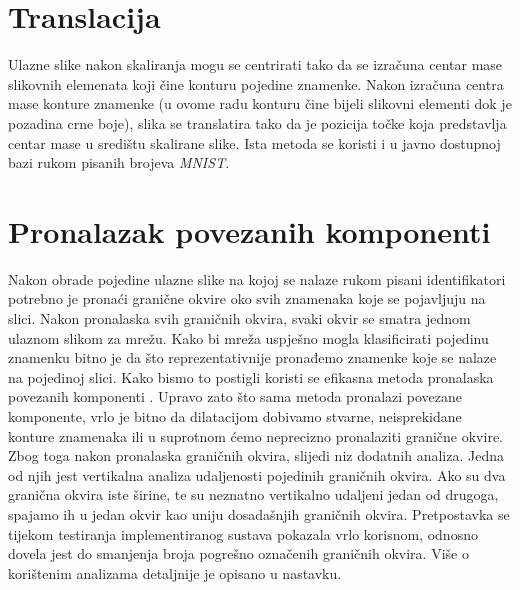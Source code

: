 \documentclass[times, utf8, diplomski]{fer}
\theoremstyle{definition}
\begin{document}
\section{Translacija}
Ulazne slike nakon skaliranja mogu se centrirati tako da se izračuna centar mase slikovnih elemenata koji čine konturu pojedine znamenke. Nakon izračuna centra mase konture znamenke (u ovome radu konturu čine bijeli slikovni elementi dok je pozadina crne boje), slika se translatira tako da je pozicija točke koja predstavlja centar mase u središtu skalirane slike. Ista metoda se koristi i u javno dostupnoj bazi rukom pisanih brojeva \textit{MNIST}.
\section{Pronalazak povezanih komponenti}
Nakon obrade pojedine ulazne slike na kojoj se nalaze rukom pisani identifikatori potrebno je pronaći granične okvire oko svih znamenaka koje se pojavljuju na slici. Nakon pronalaska svih graničnih okvira, svaki okvir se smatra jednom ulaznom slikom za mrežu. Kako bi mreža uspješno mogla klasificirati pojedinu znamenku bitno je da što reprezentativnije pronađemo znamenke koje se nalaze na pojedinoj slici. Kako bismo to postigli koristi se efikasna metoda pronalaska povezanih komponenti . Upravo zato što sama metoda pronalazi povezane komponente, vrlo je bitno da dilatacijom dobivamo stvarne, neisprekidane konture znamenaka ili u suprotnom ćemo neprecizno pronalaziti granične okvire. Zbog toga nakon pronalaska graničnih okvira, slijedi niz dodatnih analiza. Jedna od njih jest  vertikalna analiza udaljenosti pojedinih graničnih okvira. Ako su dva granična okvira iste širine, te su neznatno vertikalno udaljeni jedan od drugoga, spajamo ih u jedan okvir kao uniju dosadašnjih graničnih okvira. Pretpostavka se tijekom testiranja implementiranog sustava pokazala vrlo korisnom, odnosno dovela jest do smanjenja broja pogrešno označenih graničnih okvira. Više o korištenim analizama detaljnije je opisano u nastavku. \newline\newline
\end{document}
